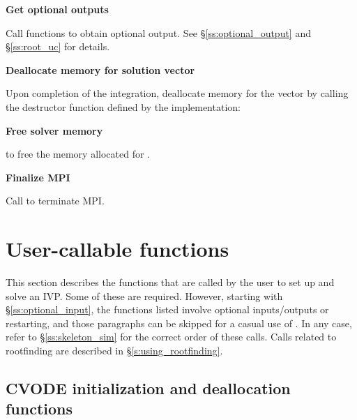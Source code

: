\begin{Steps}
\item
  {\bf Get optional outputs}

  Call  functions to obtain optional output.
  See \S\ref{ss:optional_output} and \S\ref{ss:root_uc} for details.

\item
  {\bf Deallocate memory for solution vector}

  Upon completion of the integration, deallocate memory for the vector 
  by calling the destructor function defined by the {\nvector} implementation:

  {\s} 

  {\p} 
  
\item
  {\bf Free solver memory}

   to free the memory allocated for {\cvode}.
  
\item 
  {\bf {\p} Finalize MPI}

  Call  to terminate MPI.
  
\end{Steps}

\section{User-callable functions}\label{ss:cvode_fct_sim}

This section describes the {\cvode} functions that are called by the
user to set up and solve an IVP. Some of these are required. However,
starting with \S\ref{ss:optional_input}, the functions listed involve
optional inputs/outputs or restarting, and those paragraphs can be
skipped for a casual use of {\cvode}. In any case, refer to
\S\ref{ss:skeleton_sim} for the correct order of these calls.
Calls related to rootfinding are described in \S\ref{s:using_rootfinding}.

\subsection{CVODE initialization and deallocation functions}
\label{sss:cvodemalloc}

